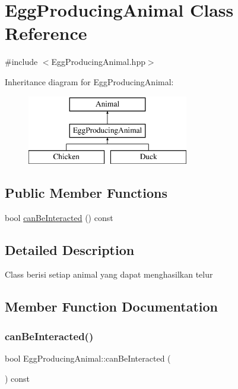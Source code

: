 \hypertarget{class_egg_producing_animal}{}\section{Egg\+Producing\+Animal Class Reference}
\label{class_egg_producing_animal}


{\ttfamily \#include $<$Egg\+Producing\+Animal.\+hpp$>$}

Inheritance diagram for Egg\+Producing\+Animal\+:\begin{figure}[H]
\begin{center}
\leavevmode
\includegraphics[height=3.000000cm]{class_egg_producing_animal}
\end{center}
\end{figure}
\subsection*{Public Member Functions}
\begin{DoxyCompactItemize}
\item 
bool \mbox{\hyperlink{class_egg_producing_animal_a3ef46d5e81f8864869a7f6d63b4036d2}{can\+Be\+Interacted}} () const
\end{DoxyCompactItemize}


\subsection{Detailed Description}
Class berisi setiap animal yang dapat menghasilkan telur 

\subsection{Member Function Documentation}
\mbox{\label{class_egg_producing_animal_a3ef46d5e81f8864869a7f6d63b4036d2}} 
\subsubsection{\texorpdfstring{canBeInteracted()}{canBeInteracted()}}
{\footnotesize\ttfamily bool Egg\+Producing\+Animal\+::can\+Be\+Interacted (\begin{DoxyParamCaption}{ }\end{DoxyParamCaption}) const\hspace{0.3cm}{\ttfamily [virtual]}}

